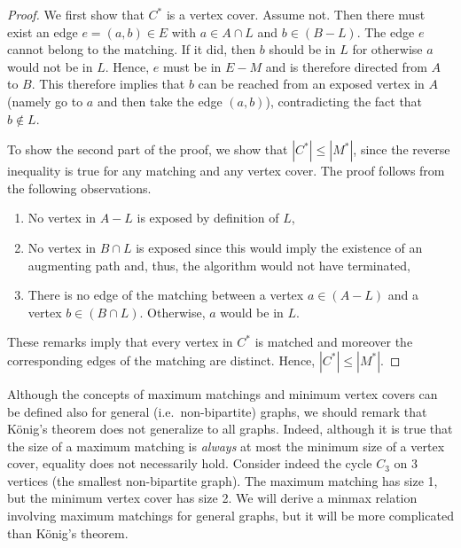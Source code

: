 \documentclass[12pt]{article}
\begin{document}
\begin{proof}
We first show that $C^*$ is a vertex cover. Assume not. Then there
must exist an edge $e=(a,b)\in E$ with $a\in A\cap L$ and $b\in
(B-L)$. The edge $e$ cannot belong to  the matching. If it did, then
$b$ should be in $L$ for otherwise $a$ would not be in $L$. Hence, $e$
must be in $E-M$ and is therefore directed from $A$ to $B$. This
therefore implies that $b$ can be reached from an exposed vertex in
$A$ (namely go to $a$ and then take the edge $(a,b)$), contradicting
the fact that $b\notin L$.

To show the second part of the proof, we show that $|C^*|\leq |M^*|$,
since the reverse inequality is true for any matching and any vertex
cover. The proof follows from the following observations.
\begin{enumerate} \item No vertex in $A-L$ is exposed by definition of
$L$, \item No vertex in $B\cap L$ is exposed since this would imply
the existence of an augmenting path and, thus, the algorithm would not
have terminated,
\item
There is no edge of the matching between a vertex $a\in (A-L)$ and a
vertex $b\in(B\cap L)$. Otherwise, $a$ would be in $L$.
\end{enumerate}
These remarks imply that every vertex in $C^*$ is matched and moreover
the corresponding edges of the matching are distinct. Hence,
$|C^*|\leq |M^*|$.
\end{proof}

Although the concepts of maximum matchings and minimum vertex covers
can be defined also for general (i.e.\ non-bipartite) graphs, we
should remark that K\"onig's theorem does not generalize to all
graphs. Indeed, although it is true that the size of a maximum
matching is {\it always} at most the minimum size of a vertex cover,
equality does not necessarily hold. Consider indeed the cycle $C_3$
on 3 vertices (the smallest non-bipartite graph). The maximum matching
has size 1, but the minimum vertex cover has size 2. We will derive a
minmax relation involving maximum matchings for general graphs, but it
will be more complicated than K\"onig's theorem.  
\end{document}
